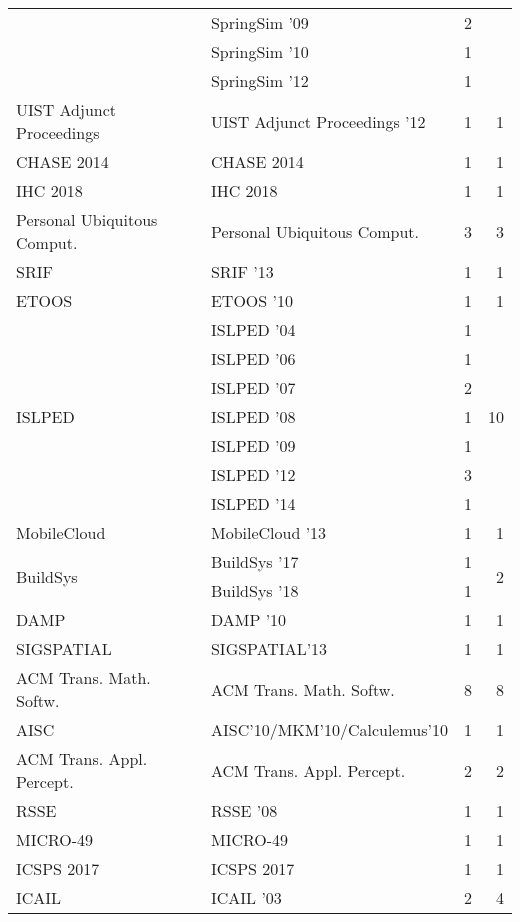 \begin{table*}[t]
\begin{tabular}{llrr}
& SpringSim '09 & 2 &\\
& SpringSim '10 & 1 &\\
& SpringSim '12 & 1 &\\
\multirow{1}{*}{UIST Adjunct Proceedings } & UIST Adjunct Proceedings '12 & 1 & \multirow{1}{*}{1}\\
\multirow{1}{*}{CHASE 2014} & CHASE 2014 & 1 & \multirow{1}{*}{1}\\
\multirow{1}{*}{IHC 2018} & IHC 2018 & 1 & \multirow{1}{*}{1}\\
\multirow{1}{*}{Personal Ubiquitous Comput.} & Personal Ubiquitous Comput. & 3 & \multirow{1}{*}{3}\\
\multirow{1}{*}{SRIF } & SRIF '13 & 1 & \multirow{1}{*}{1}\\
\multirow{1}{*}{ETOOS } & ETOOS '10 & 1 & \multirow{1}{*}{1}\\
\multirow{7}{*}{ISLPED } & ISLPED '04 & 1 & \multirow{7}{*}{10}\\
& ISLPED '06 & 1 &\\
& ISLPED '07 & 2 &\\
& ISLPED '08 & 1 &\\
& ISLPED '09 & 1 &\\
& ISLPED '12 & 3 &\\
& ISLPED '14 & 1 &\\
\multirow{1}{*}{MobileCloud } & MobileCloud '13 & 1 & \multirow{1}{*}{1}\\
\multirow{2}{*}{BuildSys } & BuildSys '17 & 1 & \multirow{2}{*}{2}\\
& BuildSys '18 & 1 &\\
\multirow{1}{*}{DAMP } & DAMP '10 & 1 & \multirow{1}{*}{1}\\
\multirow{1}{*}{SIGSPATIAL} & SIGSPATIAL'13 & 1 & \multirow{1}{*}{1}\\
\multirow{1}{*}{ACM Trans. Math. Softw.} & ACM Trans. Math. Softw. & 8 & \multirow{1}{*}{8}\\
\multirow{1}{*}{AISC} & AISC'10/MKM'10/Calculemus'10 & 1 & \multirow{1}{*}{1}\\
\multirow{1}{*}{ACM Trans. Appl. Percept.} & ACM Trans. Appl. Percept. & 2 & \multirow{1}{*}{2}\\
\multirow{1}{*}{RSSE } & RSSE '08 & 1 & \multirow{1}{*}{1}\\
\multirow{1}{*}{MICRO-49} & MICRO-49 & 1 & \multirow{1}{*}{1}\\
\multirow{1}{*}{ICSPS 2017} & ICSPS 2017 & 1 & \multirow{1}{*}{1}\\
\multirow{3}{*}{ICAIL } & ICAIL '03 & 2 & \multirow{3}{*}{4}\\

\end{tabular}
\end{table*}
